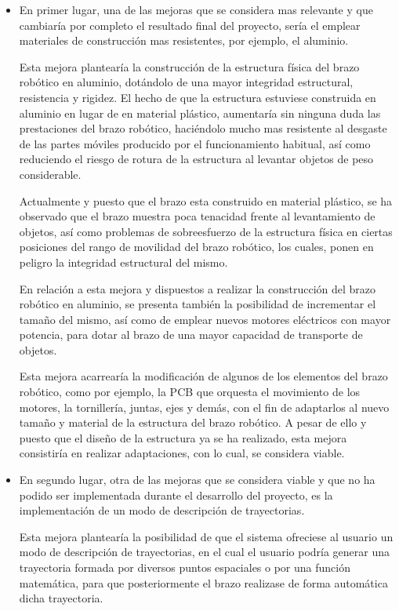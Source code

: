 \begin{itemize}
    \item En primer lugar, una de las mejoras que se considera mas relevante y que cambiaría por completo el resultado final del proyecto, sería el emplear materiales de construcción mas resistentes, por ejemplo, el aluminio.
    
    Esta mejora plantearía la construcción de la estructura física del brazo robótico en aluminio, dotándolo de una mayor integridad estructural, resistencia y rigidez. El hecho de que la estructura estuviese construida en aluminio en lugar de en material plástico, aumentaría sin ninguna duda las prestaciones del brazo robótico, haciéndolo mucho mas resistente al desgaste de las partes móviles producido por el funcionamiento habitual, así como reduciendo el riesgo de rotura de la estructura al levantar objetos de peso considerable.
    
    Actualmente y puesto que el brazo esta construido en material plástico, se ha observado que el brazo muestra poca tenacidad frente al levantamiento de objetos, así como problemas de sobreesfuerzo de la estructura física en ciertas posiciones del rango de movilidad del brazo robótico, los cuales, ponen en peligro la integridad estructural del mismo.
    
    En relación a esta mejora y dispuestos a realizar la construcción del brazo robótico en aluminio, se presenta también la posibilidad de incrementar el tamaño del mismo, así como de emplear nuevos motores eléctricos con mayor potencia, para dotar al brazo de una mayor capacidad de transporte de objetos.
    
    Esta mejora acarrearía la modificación de algunos de los elementos del brazo robótico, como por ejemplo, la PCB que orquesta el movimiento de los motores, la tornillería, juntas, ejes y demás, con el fin de adaptarlos al nuevo tamaño y material de la estructura del brazo robótico. A pesar de ello y puesto que el diseño de la estructura ya se ha realizado, esta mejora consistiría en realizar adaptaciones, con lo cual, se considera viable.
    
    \item En segundo lugar, otra de las mejoras que se considera viable y que no ha podido ser implementada durante el desarrollo del proyecto, es la implementación de un modo de descripción de trayectorias.
    
    Esta mejora plantearía la posibilidad de que el sistema ofreciese al usuario un modo de descripción de trayectorias, en el cual el usuario podría generar una trayectoria formada por diversos puntos espaciales o por una función matemática, para que posteriormente el brazo realizase de forma automática dicha trayectoria.
    

\end{itemize}
